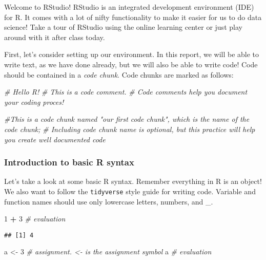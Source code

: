 \documentclass[
]{article}
\newenvironment{Shaded}{\begin{snugshade}}{\end{snugshade}}
\newcommand{\CommentTok}[1]{\textcolor[rgb]{0.56,0.35,0.01}{\textit{#1}}}
\newcommand{\DecValTok}[1]{\textcolor[rgb]{0.00,0.00,0.81}{#1}}
\newcommand{\NormalTok}[1]{#1}
\newcommand{\OperatorTok}[1]{\textcolor[rgb]{0.81,0.36,0.00}{\textbf{#1}}}
\newcommand{\StringTok}[1]{\textcolor[rgb]{0.31,0.60,0.02}{#1}}
\begin{document}
Welcome to RStudio! RStudio is an integrated development environment
(IDE) for R. It comes with a lot of nifty functionality to make it
easier for us to do data science! Take a tour of RStudio using the
online learning center or just play around with it after class today.

First, let's consider setting up our environment. In this report, we
will be able to write text, as we have done already, but we will also be
able to write code! Code should be contained in a \emph{code chunk}.
Code chunks are marked as follows:

\begin{Shaded}
\begin{Highlighting}[]
\CommentTok{# Hello R!}
\CommentTok{# This is a code comment.}
\CommentTok{# Code comments help you document your coding proces!}

\CommentTok{#This is a code chunk named "our first code chunk", which is the name of the code chunk;}
\CommentTok{# Including code chunk name is optional, but this practice will help you create well documented code}
\end{Highlighting}
\end{Shaded}

\hypertarget{introduction-to-basic-r-syntax}{%
\subsubsection{Introduction to basic R
syntax}\label{introduction-to-basic-r-syntax}}

Let's take a look at some basic R syntax. Remember everything in R is an
object! We also want to follow the \texttt{tidyverse} style guide for
writing code. Variable and function names should use only lowercase
letters, numbers, and \_.

\begin{Shaded}
\begin{Highlighting}[]
\DecValTok{1} \OperatorTok{+}\StringTok{ }\DecValTok{3}       \CommentTok{# evaluation}
\end{Highlighting}
\end{Shaded}

\begin{verbatim}
## [1] 4
\end{verbatim}

\begin{Shaded}
\begin{Highlighting}[]
\NormalTok{a <-}\StringTok{ }\DecValTok{3}  \CommentTok{# assignment. <- is the assignment symbol}
\NormalTok{a               }\CommentTok{# evaluation}
\end{Highlighting}
\end{Shaded}
\end{document}
